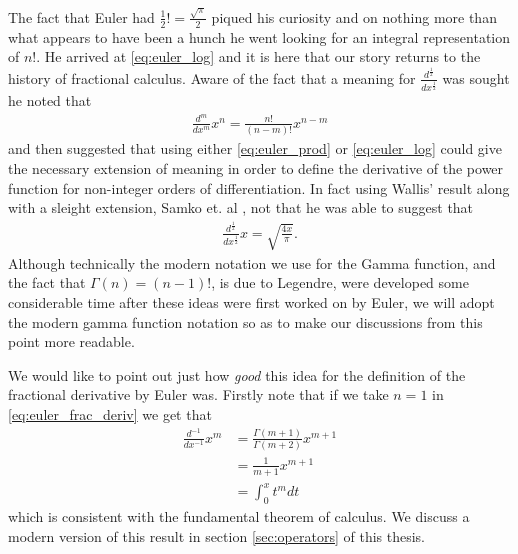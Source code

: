 The fact that Euler had $ \frac{1}{2} ! = \frac{\sqrt{\pi}}{2} $ piqued his curiosity and on nothing more than what appears to have been a hunch he went looking for an integral representation of $ n! $\cite{Davis1959}.
He arrived at \eqref{eq:euler_log} and it is here that our story returns to the history of fractional calculus. Aware of the fact that a meaning for $ \frac{d^\frac{1}{2}}{dx^\frac{1}{2}} $ was sought he noted that
\begin{align}
    \label{eq:euler_frac_deriv}
    \frac{d^m}{dx^m} x^n = \frac{n!}{(n-m)!}x^{n-m}
\end{align}
and then suggested that using either \eqref{eq:euler_prod} or \eqref{eq:euler_log} could give the necessary extension of meaning in order to define the derivative of the power function for non-integer orders of differentiation. In fact using Wallis' result along with a sleight extension, Samko et. al \cite{Davis1959}, not that he was able to suggest that
\begin{align*}
    \frac{d^\frac{1}{2}}{dx^\frac{1}{2}} x = \sqrt{\frac{4x}{\pi}}.
\end{align*}
Although technically the modern notation we use for the Gamma function, and the fact that $ \Gamma(n) = (n-1)! $, is due to Legendre, were developed some considerable time after these ideas were first worked on by Euler, we will adopt the modern gamma function notation so as to make our discussions from this point more readable.

We would like to point out just how \emph{good} this idea for the definition of the fractional derivative by Euler was.
Firstly note that if we take $ n = 1 $ in \eqref{eq:euler_frac_deriv} we get that
\begin{align*}
    \frac{d^{-1}}{dx^{-1}} x^m &= \frac{\Gamma(m+1)}{\Gamma(m+2)} x^{m+1} \\
    &= \frac{1}{m+1} x^{m+1} \\
    &= \int_0^x t^m dt
\end{align*} 
which is consistent with the fundamental theorem of calculus. We discuss a modern version of this result in section \ref{sec:operators} of this thesis. 

